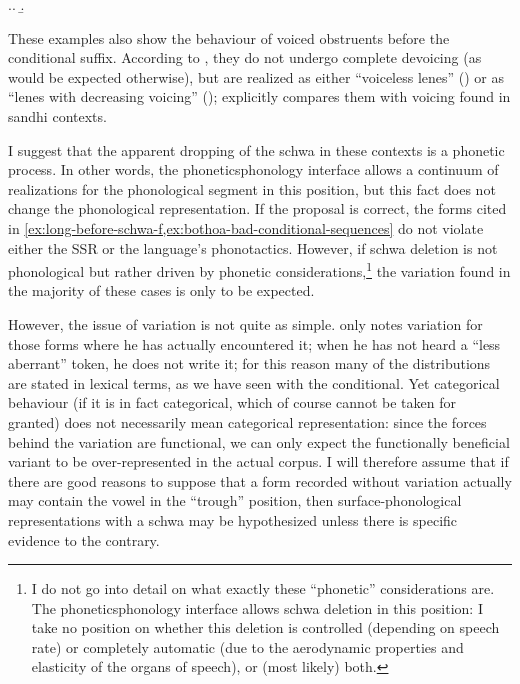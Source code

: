 \ex.\label{ex:bothoa-bad-conditional-sequences}\a.
\b.


These examples also show the behaviour of voiced obstruents before the conditional suffix. According to \citet{humphreys95:_phonol_bothoa_saint_nicol_pelem}, they do not undergo complete devoicing (as would be expected otherwise), but are realized as either \enquote{voiceless lenes} () or as \enquote{lenes with decreasing voicing} (); \citet{humphreys95:_phonol_bothoa_saint_nicol_pelem} explicitly compares them with voicing found in sandhi contexts.

I suggest that the apparent dropping of the schwa in these contexts is a phonetic process. In other words, the phonetics\endash phonology interface allows a continuum of realizations for the phonological segment \ipa{[ə]} in this position, but this fact does not change the phonological representation. If the proposal is correct, the forms cited in \cref{ex:long-before-schwa-f,ex:bothoa-bad-conditional-sequences} do not violate either the SSR or the language's phonotactics. However, if schwa deletion is not phonological but rather driven by phonetic considerations,\footnote{I do not go into detail on what exactly these \enquote{phonetic} considerations are. The phonetics\endash phonology interface allows schwa deletion in this position: I take no position on whether this deletion is controlled (\eg depending on speech rate) or completely automatic (\eg due to the aerodynamic properties and elasticity of the organs of speech), or (most likely) both.} the variation found in the majority of these cases is only to be expected.

However, the issue of variation is not quite as simple. \citet{humphreys95:_phonol_bothoa_saint_nicol_pelem} only notes variation for those forms where he has actually encountered it; when he has not heard a \enquote{less aberrant} token, he does not write it; for this reason many of the distributions are stated in lexical terms, as we have seen with the conditional. Yet categorical behaviour (if it is in fact categorical, which of course cannot be taken for granted) does not necessarily mean categorical representation: since the forces behind the variation are functional, we can only expect the functionally beneficial variant to be over-represented in the actual corpus. I will therefore assume that if there are good reasons to suppose that a form recorded without variation actually may contain the \ipa{[ə]} vowel in the \enquote{trough} position, then surface-phonological representations with a schwa may be hypothesized unless there is specific evidence to the contrary.

